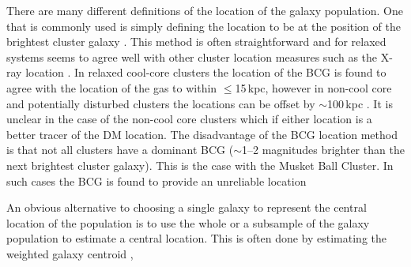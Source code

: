 There are many different definitions of the location of the galaxy population.  
One that is commonly used is simply defining the location to be at the position of the brightest cluster galaxy \citep[BCG; e.g.][]{Gladders:2000ca, Koester:2007en, Hao:2010kz}.
This method is often straightforward and for relaxed systems seems to agree well with other cluster location measures such as the X-ray location \citep{Sheldon:2001kk, Koester:2007en, Sanderson:2009hi,George:2012uo}.
In relaxed cool-core clusters the location of the BCG is found to agree with the location of the gas to within $\leq$15\,kpc, however in non-cool core and potentially disturbed clusters the locations can be offset by $\sim$100\,kpc \citep{Sanderson:2009hi}.
It is unclear in the case of the \citet{Sanderson:2009hi} non-cool core clusters which if either location is a better tracer of the DM location.
The disadvantage of the BCG location method is that not all clusters have a dominant BCG ($\sim$1--2 magnitudes brighter than the next brightest cluster galaxy).
This is the case with the Musket Ball Cluster.
In such cases the BCG is found to provide an unreliable location \citep[see e.g.][]{George:2012uo}

An obvious alternative to choosing a single galaxy to represent the central location of the population is to use the whole or a subsample of the galaxy population to estimate a central location.
This is often done by estimating the weighted galaxy centroid \citep[e.g.][]{Berlind:2006dy, Carlberg:2001fp, Jee:2011we, George:2012uo},

